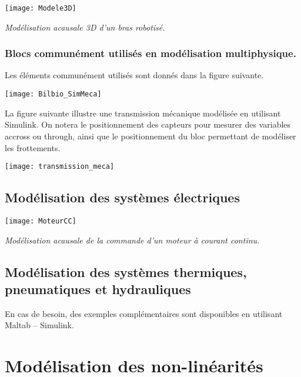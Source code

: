 \begin{center}
\texttt{[image: Modele3D]}

\textit{Modélisation acausale 3D d'un bras robotisé.}
\end{center}

\subsubsection{Blocs communément utilisés en modélisation multiphysique.}
Les éléments communément utilisés sont donnés dans la figure suivante. 

\begin{center}
\texttt{[image: Bilbio\_SimMeca]}
\end{center}

La figure suivante illustre une transmission mécanique modélisée en utilisant Simulink. On notera le positionnement des capteurs pour mesurer des variables accross ou through, ainsi que le positionnement du bloc permettant de modéliser les frottements.

\begin{center}
\texttt{[image: transmission\_meca]}
\end{center}

\subsection{Modélisation des systèmes électriques}

\begin{center}
\texttt{[image: MoteurCC]}

\textit{Modélisation acausale de la commande d'un moteur à courant continu.}
\end{center}


\subsection{Modélisation des systèmes thermiques, pneumatiques et hydrauliques}
En cas de besoin, des exemples complémentaires sont disponibles en utilisant Maltab -- Simulink.


\section{Modélisation des non-linéarités}

